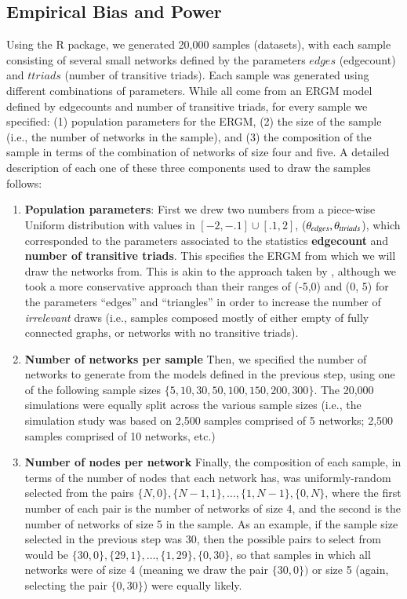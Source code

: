 \documentclass[review, nonatbib,doubleblind]{elsarticle/elsarticle}
\begin{document}
\subsection{\label{subsec:design}Empirical Bias and Power}

Using the \ergmito{} R package, we generated 20,000 samples (datasets), with each sample consisting of several small networks defined by the parameters $edges$ (edgecount) and $ttriads$ (number of transitive triads). Each sample was generated using different combinations of parameters. While all come from an ERGM model defined by edgecounts and number of transitive triads, for every sample we specified: (1) population parameters for the ERGM, (2) the size of the sample (i.e., the number of networks in the sample), and (3) the composition of the sample in terms of the combination of networks of size four and five. A detailed description of each one of these three components used to draw the samples follows:

\begin{enumerate}
\item \textbf{Population parameters}: First we drew two numbers from a piece-wise Uniform distribution with values in $[-2, -.1]\cup[.1, 2]$, ($\theta_{edges}, \theta_{ttriads}$), which corresponded to the parameters associated to the statistics \textbf{edgecount} and \textbf{number of transitive triads}. This specifies the ERGM from which we will draw the networks from. This is akin to the approach taken by \cite{Schweinberger2015} , although we took a more conservative approach than their ranges of (-5,0) and (0, 5) for the parameters ``edges'' and ``triangles'' in order to increase the number of \textit{irrelevant} draws (i.e., samples composed mostly of either empty of fully connected graphs, or networks with no transitive triads).

\item \textbf{Number of networks per sample} Then, we specified the number of networks to generate from the models defined in the previous step, using one of the following sample sizes $\{5, 10, 30, 50, 100, 150, 200, 300\}$. The 20,000 simulations were equally split across the various sample sizes (i.e., the simulation study was based on 2,500 samples comprised of 5 networks; 2,500 samples comprised of 10 networks, etc.)

\item \textbf{Number of nodes per network} Finally, the composition of each sample, in terms of the number of nodes that each network has, was uniformly-random selected from the pairs $\{N, 0\}, \{N - 1, 1\}, \dots, \{1, N - 1\}, \{0, N\}$, where the first number of each pair is the number of networks of size 4, and the second is the number of networks of size 5 in the sample. As an example, if the sample size selected in the previous step was 30, then the possible pairs to select from would be $\{30, 0\}, \{29, 1\}, \dots, \{1, 29\}, \{0, 30\}$, so that samples in which all networks were of size 4 (meaning we draw the pair $\{30, 0\})$ or size 5 (again, selecting the pair  $\{0, 30\}$) were equally likely. 
\end{enumerate}
\end{document}
